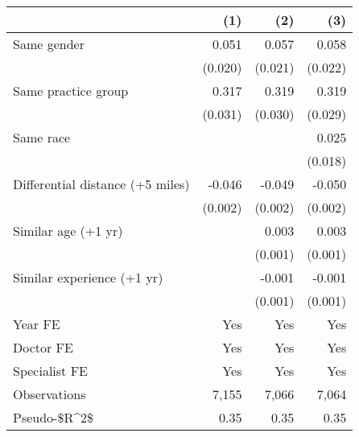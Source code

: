 \begin{table}[!h]
\centering
\begin{tabular}{lrrr}
\toprule
 & (1) & (2) & (3)\\
\midrule
Same gender & 0.051 & 0.057 & 0.058\\
 & (0.020) & (0.021) & (0.022)\\
Same practice group & 0.317 & 0.319 & 0.319\\
 & (0.031) & (0.030) & (0.029)\\
Same race &  &  & 0.025\\
\addlinespace
 &  &  & (0.018)\\
Differential distance (+5 miles) & -0.046 & -0.049 & -0.050\\
 & (0.002) & (0.002) & (0.002)\\
Similar age (+1 yr) &  & 0.003 & 0.003\\
 &  & (0.001) & (0.001)\\
\addlinespace
Similar experience (+1 yr) &  & -0.001 & -0.001\\
 &  & (0.001) & (0.001)\\
Year FE & Yes & Yes & Yes\\
Doctor FE & Yes & Yes & Yes\\
Specialist FE & Yes & Yes & Yes\\
\addlinespace
Observations & 7,155 & 7,066 & 7,064\\
Pseudo-\$R\textasciicircum{}2\$ & 0.35 & 0.35 & 0.35\\
\bottomrule
\end{tabular}
\end{table}
